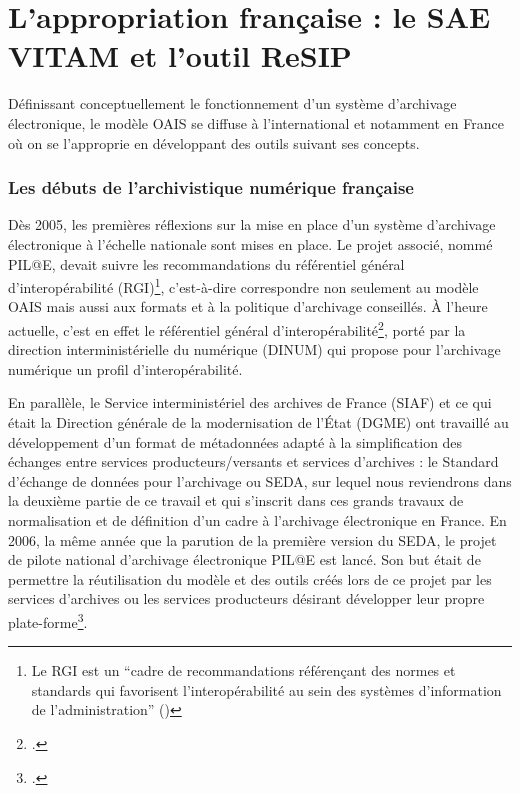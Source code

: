\chapter{L'appropriation française : le SAE VITAM et l’outil ReSIP}
Définissant conceptuellement le fonctionnement d’un système d’archivage électronique, le modèle \gls{OAIS} se diffuse à l’international et notamment en France où on se l’approprie en développant des outils suivant ses concepts.

 
\subsection{Les débuts de l’archivistique numérique française}
Dès 2005, les premières réflexions sur la mise en place d’un système d’archivage électronique à l’échelle nationale sont mises en place. Le projet associé, nommé PIL@E, devait suivre les recommandations du référentiel général d’interopérabilité (RGI)\footnote{Le RGI est un \enquote{cadre de recommandations référençant des normes et standards qui favorisent l’interopérabilité au sein des systèmes d’information de l’administration} (\cite[p.64]{gueit-montchal_chapitre_2020})
}, c’est-à-dire correspondre non seulement au modèle \gls{OAIS} mais aussi aux formats et à la politique d’archivage conseillés. À l’heure actuelle, c’est en effet le référentiel général d’interopérabilité\footcite{noauthor_referentiel_nodate}, porté par la direction interministérielle du numérique (DINUM) qui propose pour l’archivage numérique un profil d’interopérabilité.


En parallèle, le Service interministériel des archives de France (SIAF) et ce qui était la Direction générale de la modernisation de l’État (DGME) ont travaillé au développement d’un format de métadonnées adapté à la simplification des échanges entre services producteurs/versants et services d’archives : le Standard d’échange de données pour l’archivage ou \gls{SEDA}, sur lequel nous reviendrons dans la deuxième partie de ce travail et qui s’inscrit dans ces grands travaux de normalisation et de définition d’un cadre à l’archivage électronique en France. En 2006, la même année que la parution de la première version du \gls{SEDA}, le projet de pilote national d’archivage électronique PIL@E est lancé. Son but était de permettre la réutilisation du modèle et des outils créés lors de ce projet par les services d’archives ou les services producteurs désirant développer leur propre plate-forme\footcite{sibille-de_grimouard_projet_2015}.


